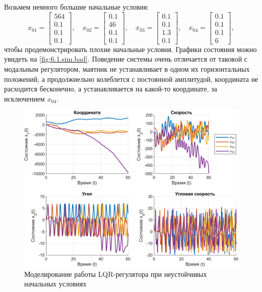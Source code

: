 Возьмем немного большие начальные условия:
\begin{equation*}
    x_{01}=\begin{bmatrix}
        564\\
        0.1\\
        0.1\\
        0.1
    \end{bmatrix},\quad
    x_{02}=\begin{bmatrix}
        0.1\\
        46\\
        0.1\\
        0.1
    \end{bmatrix},\quad
    x_{03}=\begin{bmatrix}
        0.1\\
        0.1\\
        1.3\\
        0.1
    \end{bmatrix},\quad
    x_{04}=\begin{bmatrix}
        0.1\\
        0.1\\
        0.1\\
        6
    \end{bmatrix},
\end{equation*}
чтобы продемонстрировать плохие начальные условия.
Графики состояния можно увидеть на \autoref{fig:6.1.sim.bad}.
Поведение системы очень отличается от таковой с модальным регулятором,
маятник не устанавливает в одном их горизонтальных положений, а продолжиельно
колеблется с постоянной амплитудой, координата не расходится бесконечно,
а устанавливается на какой-то координате, за исключением $x_{04}$.
\begin{figure}[H]
    \centering
    \includegraphics[width=\linewidth]{figs/6.1.sim.bad.png}
    \caption{Моделирование работы LQR-регулятора при неустойчивых 
    начальных условиях}
    \label{fig:6.1.sim.bad}
\end{figure}

